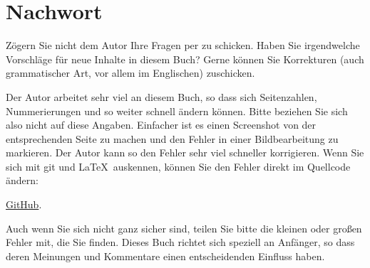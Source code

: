 \part*{Nachwort}


Zögern Sie nicht dem Autor Ihre Fragen per \GTT{\EMAILS} zu schicken.
Haben Sie irgendwelche Vorschläge für neue Inhalte in diesem Buch?
Gerne können Sie Korrekturen (auch grammatischer Art, vor allem im Englischen) zuschicken.

Der Autor arbeitet sehr viel an diesem Buch, so dass sich Seitenzahlen, Nummerierungen und so weiter
schnell ändern können. Bitte beziehen Sie sich also nicht auf diese Angaben.
Einfacher ist es einen Screenshot von der entsprechenden Seite zu machen und den Fehler in einer Bildbearbeitung
zu markieren. Der Autor kann so den Fehler sehr viel schneller korrigieren.
Wenn Sie sich mit git und \LaTeX\ auskennen, können Sie den Fehler direkt im Quellcode ändern:

\href{http://go.yurichev.com/17089}{GitHub}.

Auch wenn Sie sich nicht ganz sicher sind, teilen Sie bitte die kleinen oder großen Fehler mit, die Sie finden.
Dieses Buch richtet sich speziell an Anfänger, so dass deren Meinungen und Kommentare einen entscheidenden Einfluss haben.
